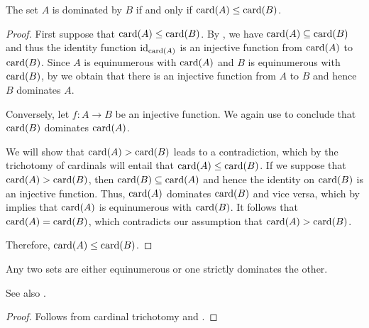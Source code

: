 \begin{proposition}\label{thm:cardinality_order_compatibility}
  The set \( A \) is dominated by \( B \) if and only if \( \operatorname{card}(A) \leq \operatorname{card}(B) \).
\end{proposition}
\begin{proof}
  \SufficiencySubProof First suppose that \( \operatorname{card}(A) \leq \operatorname{card}(B) \). By , we have \( \operatorname{card}(A) \subseteq \operatorname{card}(B) \) and thus the identity function \( \operatorname{id}_{\operatorname{card}(A)} \) is an injective function from \( \operatorname{card}(A) \) to \( \operatorname{card}(B) \). Since \( A \) is equinumerous with \( \operatorname{card}(A) \) and \( B \) is equinumerous with \( \operatorname{card}(B) \), by  we obtain that there is an injective function from \( A \) to \( B \) and hence \( B \) dominates \( A \).

  \NecessitySubProof Conversely, let \( f: A \to B \) be an injective function. We again use  to conclude that \( \operatorname{card}(B) \) dominates \( \operatorname{card}(A) \).

  We will show that \( \operatorname{card}(A) > \operatorname{card}(B) \) leads to a contradiction, which by the trichotomy of cardinals will entail that \( \operatorname{card}(A) \leq \operatorname{card}(B) \). If we suppose that \( \operatorname{card}(A) > \operatorname{card}(B) \), then \( \operatorname{card}(B) \subseteq \operatorname{card}(A) \) and hence the identity on \( \operatorname{card}(B) \) is an injective function. Thus, \( \operatorname{card}(A) \) dominates \( \operatorname{card}(B) \) and vice versa, which by  implies that \( \operatorname{card}(A) \) is equinumerous with \( \operatorname{card}(B) \). It follows that \( \operatorname{card}(A) = \operatorname{card}(B) \), which contradicts our assumption that \( \operatorname{card}(A) > \operatorname{card}(B) \).

  Therefore, \( \operatorname{card}(A) \leq \operatorname{card}(B) \).
\end{proof}

\begin{corollary}\label{thm:set_domination_relation_trichotomy}
  Any two sets are either equinumerous or one strictly dominates the other.
\end{corollary}
\begin{comments}
  \item See also .
\end{comments}
\begin{proof}
  Follows from cardinal trichotomy and .
\end{proof}

